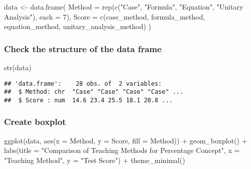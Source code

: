 \documentclass[
]{article}
\newenvironment{Shaded}{\begin{snugshade}}{\end{snugshade}}
\newcommand{\AttributeTok}[1]{\textcolor[rgb]{0.77,0.63,0.00}{#1}}
\newcommand{\DecValTok}[1]{\textcolor[rgb]{0.00,0.00,0.81}{#1}}
\newcommand{\FunctionTok}[1]{\textcolor[rgb]{0.00,0.00,0.00}{#1}}
\newcommand{\NormalTok}[1]{#1}
\newcommand{\OtherTok}[1]{\textcolor[rgb]{0.56,0.35,0.01}{#1}}
\newcommand{\SpecialCharTok}[1]{\textcolor[rgb]{0.00,0.00,0.00}{#1}}
\newcommand{\StringTok}[1]{\textcolor[rgb]{0.31,0.60,0.02}{#1}}
\begin{document}
\begin{Shaded}
\begin{Highlighting}[]
\NormalTok{data }\OtherTok{\textless{}{-}} \FunctionTok{data.frame}\NormalTok{(}
  \AttributeTok{Method =} \FunctionTok{rep}\NormalTok{(}\FunctionTok{c}\NormalTok{(}\StringTok{"Case"}\NormalTok{, }\StringTok{"Formula"}\NormalTok{, }\StringTok{"Equation"}\NormalTok{, }\StringTok{"Unitary Analysis"}\NormalTok{), }\AttributeTok{each =} \DecValTok{7}\NormalTok{),}
  \AttributeTok{Score =} \FunctionTok{c}\NormalTok{(case\_method, formula\_method, equation\_method, unitary\_analysis\_method)}
\NormalTok{)}
\end{Highlighting}
\end{Shaded}

\hypertarget{check-the-structure-of-the-data-frame}{%
\subsubsection{Check the structure of the data
frame}\label{check-the-structure-of-the-data-frame}}

\begin{Shaded}
\begin{Highlighting}[]
\FunctionTok{str}\NormalTok{(data)}
\end{Highlighting}
\end{Shaded}

\begin{verbatim}
## 'data.frame':    28 obs. of  2 variables:
##  $ Method: chr  "Case" "Case" "Case" "Case" ...
##  $ Score : num  14.6 23.4 25.5 18.1 20.8 ...
\end{verbatim}

\hypertarget{create-boxplot}{%
\subsubsection{Create boxplot}\label{create-boxplot}}

\begin{Shaded}
\begin{Highlighting}[]
\FunctionTok{ggplot}\NormalTok{(data, }\FunctionTok{aes}\NormalTok{(}\AttributeTok{x =}\NormalTok{ Method, }\AttributeTok{y =}\NormalTok{ Score, }\AttributeTok{fill =}\NormalTok{ Method)) }\SpecialCharTok{+}
  \FunctionTok{geom\_boxplot}\NormalTok{() }\SpecialCharTok{+}
  \FunctionTok{labs}\NormalTok{(}\AttributeTok{title =} \StringTok{"Comparison of Teaching Methods for Percentage Concept"}\NormalTok{,}
       \AttributeTok{x =} \StringTok{"Teaching Method"}\NormalTok{,}
       \AttributeTok{y =} \StringTok{"Test Score"}\NormalTok{) }\SpecialCharTok{+}
  \FunctionTok{theme\_minimal}\NormalTok{()}
\end{Highlighting}
\end{Shaded}
\end{document}
